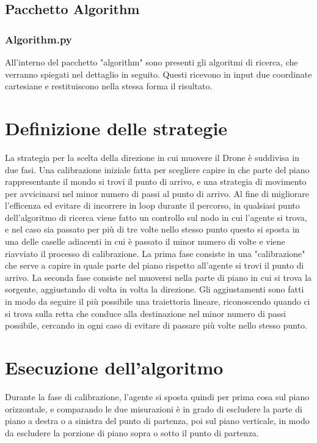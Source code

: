 \subsection{Pacchetto Algorithm}

\subsubsection{Algorithm.py}
All'interno del pacchetto "algorithm" sono presenti gli algoritmi di ricerca, che verranno spiegati nel dettaglio in seguito. Questi ricevono in input due coordinate cartesiane e restituiscono nella stessa forma il risultato.
	
\section{Definizione delle strategie}
La strategia per la scelta della direzione in cui muovere il Drone è suddivisa in due fasi. Una calibrazione iniziale fatta per scegliere capire in che parte del piano rappresentante il mondo si trovi il punto di arrivo, e una strategia di movimento per avvicinarsi nel minor numero di passi al punto di arrivo. Al fine di migliorare l'efficenza ed evitare di incorrere in loop durante il percorso, in qualsiasi punto dell'algoritmo di ricerca viene fatto un controllo sul nodo in cui l'agente si trova, e nel caso sia passato per più di tre volte nello stesso punto questo si sposta in una delle caselle adiacenti in cui è passato il minor numero di volte e viene riavviato il processo di calibrazione.
La prima fase consiste in una "calibrazione" che serve a capire in quale parte del piano rispetto all'agente si trovi il punto di arrivo. 
La seconda fase consiste nel muoversi nella parte di piano in cui si trova la sorgente, aggiustando di volta in volta la direzione. Gli aggiustamenti sono fatti in modo da seguire il più possibile una traiettoria lineare, riconoscendo quando ci si trova sulla retta che conduce alla destinazione nel minor numero di passi possibile, cercando in ogni caso di evitare di passare più volte nello stesso punto.
	
\section{Esecuzione dell'algoritmo}
Durante la fase di calibrazione, l'agente si sposta quindi per prima cosa sul piano orizzontale, e comparando le due misurazioni è in grado di escludere la parte di piano a destra o a sinistra del punto di partenza, poi sul piano verticale, in modo da escludere la porzione di piano sopra o sotto il punto di partenza. 

